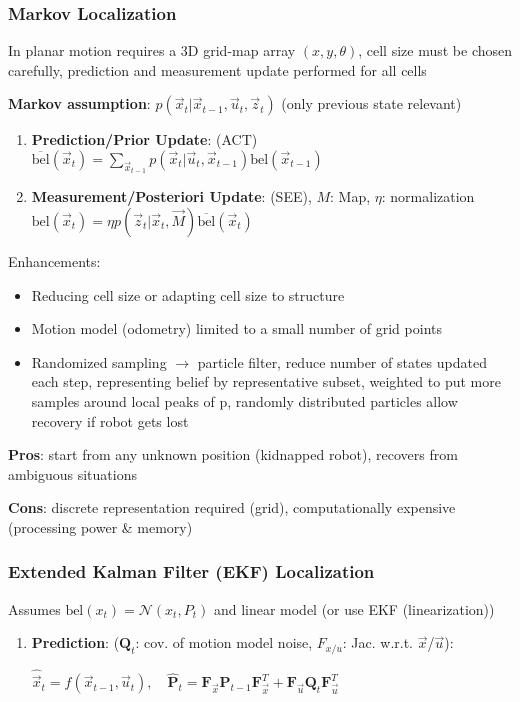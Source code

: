 \documentclass[fontsize=6pt]{scrartcl}
\newcommand{\mat}[1]{\mathbf{#1}}
\begin{document}
\begin{multicols*}{4}
\subsubsection*{Markov Localization}

In planar motion requires a 3D grid-map array $(x,y,\theta)$, cell size must be chosen carefully,
prediction and measurement update performed for all cells

\textbf{Markov assumption}: $p(\vec x_t|\vec x_{t-1}, \vec u_t, \vec z_t)$ (only previous state relevant)

\begin{enumerate}
	\item \textbf{Prediction/Prior Update}: (ACT)\\
	$\overline{\text{bel}}(\vec x_t) = \sum_{\vec x_{t-1}} p(\vec x_t | \vec u_t, \vec x_{t-1}) \text{bel}(\vec x_{t-1})$
	\item \textbf{Measurement/Posteriori Update}: (SEE), $M$: Map, $\eta$: normalization\\
	$\text{bel}(\vec x_t) = \eta p(\vec z_t| \vec x_t, \vec M) \overline{\text{bel}}(\vec x_{t})$
\end{enumerate}

Enhancements:
\begin{itemize}
	\item Reducing cell size or adapting cell size to structure
	\item Motion model (odometry) limited to a small number of grid points
	\item Randomized sampling $\rightarrow$ particle filter, reduce number of states updated each step, representing belief by representative subset, weighted to put more samples around local peaks of p, randomly distributed particles allow recovery if robot gets lost	
\end{itemize}

\textbf{Pros}:	start from any unknown position (kidnapped robot), recovers from ambiguous situations

\textbf{Cons}:	discrete representation required (grid), computationally expensive (processing power \& memory)


\subsubsection*{Extended Kalman Filter (EKF) Localization} 
Assumes $\text{bel}(x_t) = \mathcal N (x_t, P_t)$ and linear model (or use EKF (linearization))

\begin{enumerate}
	\item \textbf{Prediction}: ($\mat Q_t$: cov. of motion model
	noise, $F_{x/u}$: Jac. w.r.t. $\vec x$/$\vec u$):
\begin{center}
	$
	\hat{\vec x}_t = f(\vec x_{t-1}, \vec u_t), \quad
	\hat{\mat P}_t = 
	\mat F_{\vec x} \mat P_{t-1} \mat F_{\vec x}^T 
	+ 
	\mat F_{\vec u} \mat Q_{t} \mat F_{\vec u}^T
	$
\end{center}


\end{enumerate}
\end{multicols*}
\end{document}
